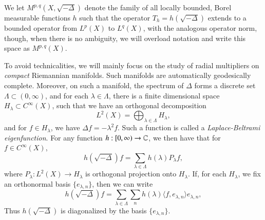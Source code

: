 We let $M^{p,q}(X, \sqrt{-\Delta} )$ denote the family of all locally bounded, Borel measurable functions $h$ such that the operator $T_h = h(\sqrt{-\Delta})$ extends to a bounded operator from $L^p(X)$ to $L^q(X)$, with the analogous operator norm, though, when there is no ambiguity, we will overload notation and write this space as $M^{p,q}(X)$.

To avoid technicalities, we will mainly focus on the study of radial multipliers on \emph{compact} Riemannian manifolds. Such manifolds are automatically geodesically complete. Moreover, on such a manifold, the spectrum of $\Delta$ forms a discrete set $\Lambda \subset (0,\infty)$, and for each $\lambda \in \Lambda$, there is a finite dimensional space $H_\lambda \subset C^\infty(X)$, such that we have an orthogonal decomposition
%
\[ L^2(X) = \bigoplus_{\lambda \in \Lambda} H_\lambda, \]
%
and for $f \in H_\lambda$, we have $\Delta f = - \lambda^2 f$. Such a function is called a \emph{Laplace-Beltrami eigenfunction}. For any function $h: [0,\infty) \to \operatorname{\mathbb{C}}$, we then have that for $f \in C^\infty(X)$,
%
\[ h(\sqrt{-\Delta}) f = \sum_{\lambda \in \Lambda} h(\lambda) P_\lambda f, \]
%
where $P_\lambda: L^2(X) \to H_\lambda$ is orthogonal projection onto $H_\lambda$. If, for each $H_\lambda$, we fix an orthonormal basis $\{ e_{\lambda,n} \}$, then we can write
%
\[ h(\sqrt{-\Delta}) f = \sum_{\lambda \in \Lambda} \sum_n h(\lambda) \langle f, e_{\lambda,n} \rangle e_{\lambda,n}, \]
%
Thus $h(\sqrt{-\Delta})$ is diagonalized by the basis $\{ e_{\lambda,n} \}$.

